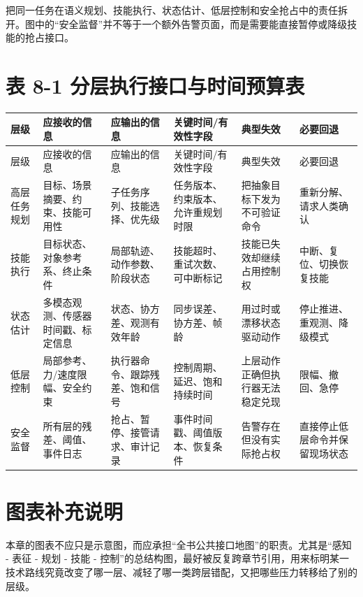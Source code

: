 \texttt{} 把同一任务在语义规划、技能执行、状态估计、低层控制和安全抢占中的责任拆开。图中的“安全监督”并不等于一个额外告警页面，而是需要能直接暂停或降级技能的抢占接口。

\chapter*{表 8-1 分层执行接口与时间预算表}

\begingroup
\small
\begin{xltabular}{\textwidth}{YYYYYY}
\toprule
层级 & 应接收的信息 & 应输出的信息 & 关键时间/有效性字段 & 典型失效 & 必要回退 \\
\midrule
\endfirsthead
\toprule
层级 & 应接收的信息 & 应输出的信息 & 关键时间/有效性字段 & 典型失效 & 必要回退 \\
\midrule
\endhead
高层任务规划 & 目标、场景摘要、约束、技能可用性 & 子任务序列、技能选择、优先级 & 任务版本、约束版本、允许重规划时限 & 把抽象目标下发为不可验证命令 & 重新分解、请求人类确认 \\
技能执行 & 目标状态、对象参考系、终止条件 & 局部轨迹、动作参数、阶段状态 & 技能超时、重试次数、可中断标记 & 技能已失效却继续占用控制权 & 中断、复位、切换恢复技能 \\
状态估计 & 多模态观测、传感器时间戳、标定信息 & 状态、协方差、观测有效年龄 & 同步误差、协方差、帧龄 & 用过时或漂移状态驱动动作 & 停止推进、重观测、降级模式 \\
低层控制 & 局部参考、力/速度限幅、安全约束 & 执行器命令、跟踪残差、饱和信号 & 控制周期、延迟、饱和持续时间 & 上层动作正确但执行器无法稳定兑现 & 限幅、撤回、急停 \\
安全监督 & 所有层的残差、阈值、事件日志 & 抢占、暂停、接管请求、审计记录 & 事件时间戳、阈值版本、恢复条件 & 告警存在但没有实际抢占权 & 直接停止低层命令并保留现场状态 \\
\bottomrule
\end{xltabular}
\endgroup

\chapter*{图表补充说明}

本章的图表不应只是示意图，而应承担“全书公共接口地图”的职责。尤其是“感知 - 表征 - 规划 - 技能 - 控制”的总结构图，最好被反复跨章节引用，用来标明某一技术路线究竟改变了哪一层、减轻了哪一类跨层错配，又把哪些压力转移给了别的层级。

